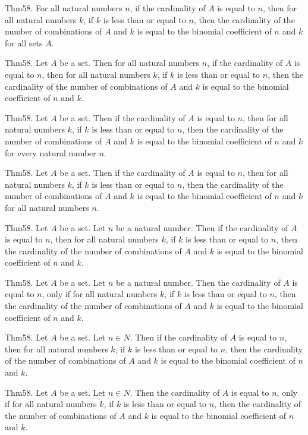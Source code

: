 \documentclass{article}
\begin{document}
Thm58. For all natural numbers $n$, if the cardinality of $A$ is equal to $n$, then for all natural numbers $k$, if $k$ is less than or equal to $n$, then the cardinality of the number of combinations of $A$ and $k$ is equal to the binomial coefficient of $n$ and $k$ for all sets $A$.

Thm58. Let $A$ be a set. Then for all natural numbers $n$, if the cardinality of $A$ is equal to $n$, then for all natural numbers $k$, if $k$ is less than or equal to $n$, then the cardinality of the number of combinations of $A$ and $k$ is equal to the binomial coefficient of $n$ and $k$.

Thm58. Let $A$ be a set. Then if the cardinality of $A$ is equal to $n$, then for all natural numbers $k$, if $k$ is less than or equal to $n$, then the cardinality of the number of combinations of $A$ and $k$ is equal to the binomial coefficient of $n$ and $k$ for every natural number $n$.

Thm58. Let $A$ be a set. Then if the cardinality of $A$ is equal to $n$, then for all natural numbers $k$, if $k$ is less than or equal to $n$, then the cardinality of the number of combinations of $A$ and $k$ is equal to the binomial coefficient of $n$ and $k$ for all natural numbers $n$.

Thm58. Let $A$ be a set. Let $n$ be a natural number. Then if the cardinality of $A$ is equal to $n$, then for all natural numbers $k$, if $k$ is less than or equal to $n$, then the cardinality of the number of combinations of $A$ and $k$ is equal to the binomial coefficient of $n$ and $k$.

Thm58. Let $A$ be a set. Let $n$ be a natural number. Then the cardinality of $A$ is equal to $n$, only if for all natural numbers $k$, if $k$ is less than or equal to $n$, then the cardinality of the number of combinations of $A$ and $k$ is equal to the binomial coefficient of $n$ and $k$.

Thm58. Let $A$ be a set. Let $n \in N$. Then if the cardinality of $A$ is equal to $n$, then for all natural numbers $k$, if $k$ is less than or equal to $n$, then the cardinality of the number of combinations of $A$ and $k$ is equal to the binomial coefficient of $n$ and $k$.

Thm58. Let $A$ be a set. Let $n \in N$. Then the cardinality of $A$ is equal to $n$, only if for all natural numbers $k$, if $k$ is less than or equal to $n$, then the cardinality of the number of combinations of $A$ and $k$ is equal to the binomial coefficient of $n$ and $k$.
\end{document}
